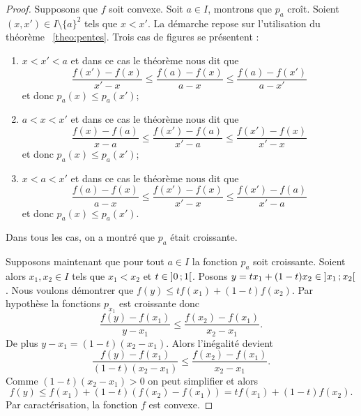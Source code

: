 \begin{proof}
  Supposons que \(f\) soit convexe. Soit \(a \in I\), montrons que \(p_a\) 
  croît. Soient \((x,x') \in I\setminus\{a\}^2\) tels que \(x < x'\). La 
  démarche repose sur l'utilisation du théorème~
  \ref{theo:pentes}. Trois cas de figures se présentent :
  \begin{enumerate}
    \item \(x < x' < a\) et dans ce cas le théorème nous dit que
      \begin{equation}
        \frac{f(x')-f(x)}{x'-x} \leqslant \frac{f(a)-f(x)}{a-x} \leqslant 
        \frac{f(a)-f(x')}{a-x'}
      \end{equation}
      et donc \(p_a(x) \leqslant p_a(x')\);
    \item \(a < x < x'\) et dans ce cas le théorème nous dit que
      \begin{equation}
        \frac{f(x)-f(a)}{x-a} \leqslant \frac{f(x')-f(a)}{x'-a} \leqslant 
        \frac{f(x')-f(x)}{x'-x}
      \end{equation}
      et donc \(p_a(x) \leqslant p_a(x')\);
    \item \(x<a<x'\)  et dans ce cas le théorème nous dit que
      \begin{equation}
        \frac{f(a)-f(x)}{a-x} \leqslant \frac{f(x')-f(x)}{x'-x} \leqslant 
        \frac{f(x')-f(a)}{x'-a}
      \end{equation}
      et donc \(p_a(x) \leqslant p_a(x')\).
  \end{enumerate}
  Dans tous les cas, on a montré que \(p_a\) était croissante.

  Supposons maintenant que pour tout \(a \in I\) la fonction \(p_a\) soit 
  croissante. Soient alors \(x_1,x_2 \in I\) tels que \(x_1<x_2\) et \(t \in 
  \left] 0 \, ;  1 \right[\). Posons \(y=tx_1+(1-t)x_2 \in \left] x_1 \, ;  x_2 \right[\). 
  Nous voulons démontrer que \(f(y) \leqslant tf(x_1)+(1-t)f(x_2)\). Par 
  hypothèse la fonctions \(p_{x_1}\) est croissante donc \begin{equation}
    \frac{f(y)-f(x_1)}{y-x_1} \leqslant \frac{f(x_2)-f(x_1)}{x_2-x_1}.
  \end{equation}
  De plus \(y-x_1=(1-t)(x_2-x_1)\). Alors l'inégalité devient
  \begin{equation}
    \frac{f(y)-f(x_1)}{(1-t)(x_2-x_1)} \leqslant \frac{f(x_2)-f(x_1)}{x_2-x_1}.
  \end{equation}
  Comme \((1-t)(x_2-x_1)>0\) on peut simplifier et alors
  \begin{equation}
    f(y) \leqslant f(x_1)+(1-t)(f(x_2)-f(x_1)) = tf(x_1)+(1-t)f(x_2).
  \end{equation}
  Par caractérisation, la fonction \(f\) est convexe.
\end{proof}

